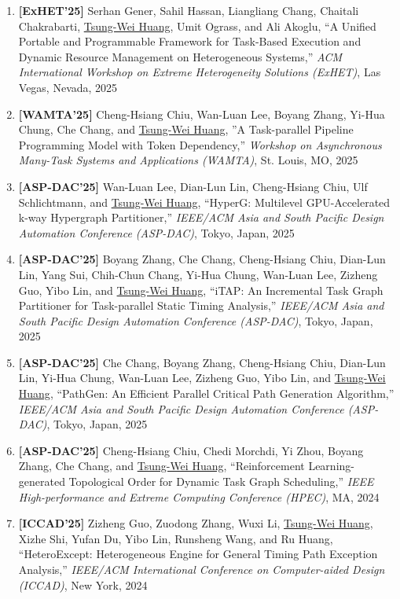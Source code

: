 \documentclass[A4,11pt]{article}
\begin{document}
\begin{enumerate}
    \item \textbf{[ExHET'25]} Serhan Gener, Sahil Hassan, Liangliang Chang, Chaitali Chakrabarti, \underline{Tsung-Wei Huang}, Umit Ograss, and Ali Akoglu, ``A Unified Portable and Programmable Framework for Task-Based Execution and Dynamic Resource Management on Heterogeneous Systems,'' \textit{ACM International Workshop on Extreme Heterogeneity Solutions (ExHET)}, Las Vegas, Nevada, 2025

    \item \textbf{[WAMTA'25]} Cheng-Hsiang Chiu, Wan-Luan Lee, Boyang Zhang, Yi-Hua Chung, Che Chang, and \underline{Tsung-Wei Huang}, ''A Task-parallel Pipeline Programming Model with Token Dependency,'' \textit{Workshop on Asynchronous Many-Task Systems and Applications (WAMTA)}, St. Louis, MO, 2025

    \item \textbf{[ASP-DAC'25]} Wan-Luan Lee, Dian-Lun Lin, Cheng-Hsiang Chiu, Ulf Schlichtmann, and \underline{Tsung-Wei Huang}, ``HyperG: Multilevel GPU-Accelerated k-way Hypergraph Partitioner,'' \textit{IEEE/ACM Asia and South Pacific Design Automation Conference (ASP-DAC)}, Tokyo, Japan, 2025

    \item \textbf{[ASP-DAC'25]} Boyang Zhang, Che Chang, Cheng-Hsiang Chiu, Dian-Lun Lin, Yang Sui, Chih-Chun Chang, Yi-Hua Chung, Wan-Luan Lee, Zizheng Guo, Yibo Lin, and \underline{Tsung-Wei Huang}, ``iTAP: An Incremental Task Graph Partitioner for Task-parallel Static Timing Analysis,'' \textit{IEEE/ACM Asia and South Pacific Design Automation Conference (ASP-DAC)}, Tokyo, Japan, 2025

    \item \textbf{[ASP-DAC'25]} Che Chang, Boyang Zhang, Cheng-Hsiang Chiu, Dian-Lun Lin, Yi-Hua Chung, Wan-Luan Lee, Zizheng Guo, Yibo Lin, and \underline{Tsung-Wei Huang}, ``PathGen: An Efficient Parallel Critical Path Generation Algorithm,'' \textit{IEEE/ACM Asia and South Pacific Design Automation Conference (ASP-DAC)}, Tokyo, Japan, 2025

    \item \textbf{[ASP-DAC'25]} Cheng-Hsiang Chiu, Chedi Morchdi, Yi Zhou, Boyang Zhang, Che Chang, and \underline{Tsung-Wei Huang}, ``Reinforcement Learning-generated Topological Order for Dynamic Task Graph Scheduling,'' \textit{IEEE High-performance and Extreme Computing Conference (HPEC)}, MA, 2024

    \item \textbf{[ICCAD'25]} Zizheng Guo, Zuodong Zhang, Wuxi Li, \underline{Tsung-Wei Huang}, Xizhe Shi, Yufan Du, Yibo Lin, Runsheng Wang, and Ru Huang, ``HeteroExcept: Heterogeneous Engine for General Timing Path Exception Analysis,'' \textit{IEEE/ACM International Conference on Computer-aided Design (ICCAD)}, New York, 2024 


\end{enumerate}
\end{document}
